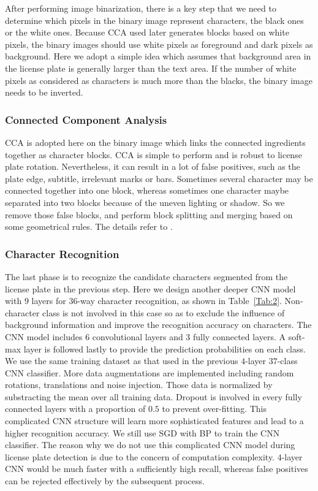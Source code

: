 \documentclass[twocolumn]{svjour3}
\begin{document}
After performing image binarization, there is a key step that we need to determine which pixels in the binary image represent characters, the black ones or the white ones. Because CCA used later generates blocks based on white pixels, the binary images should use white pixels as foreground and dark pixels as background. Here we adopt a simple idea which assumes that background area in the license plate is generally larger than the text area. If the number of white pixels as considered as characters is much more than the blacks, the binary image needs to be inverted.

\subsubsection{Connected Component Analysis}
CCA is adopted here on the binary image which links the connected ingredients together as character blocks. %
CCA is simple to perform and is robust to license plate rotation. Nevertheless, it can result in a lot of false positives, such as the plate edge, subtitle, irrelevant marks or bars. Sometimes several character may be connected together into one block, whereas sometimes one character maybe separated into two blocks because of the uneven lighting or shadow. So we remove those false blocks, and perform block splitting and merging based on some geometrical rules. The details refer to \cite{Yoon2011}.

\subsubsection{Character Recognition}
The last phase is to recognize the candidate characters segmented from the license plate in the previous step.
Here we design another deeper CNN model with $9$ layers for $36$-way character recognition, as shown in Table~\ref{Tab:2}. Non-character class is not involved in this case so as to exclude the influence of background information and improve the recognition accuracy on characters. The CNN model includes $6$ convolutional layers and $3$ fully connected layers. A soft-max layer is followed lastly to provide the prediction probabilities on each class.
We use the same training dataset as that used in the previous $4$-layer $37$-class CNN classifier. More data augmentations are implemented including random rotations, translations and noise injection. Those data is normalized by substracting the mean over all training data. Dropout is involved in every fully connected layers with a proportion of $0.5$ to prevent over-fitting. This complicated CNN structure will learn more sophisticated features and lead to a higher recognition accuracy. We still use SGD with BP to train the CNN classifier. The reason why we do not use this complicated CNN model during license plate detection is due to the concern of computation complexity. $4$-layer CNN would be much faster with a sufficiently high recall, whereas false positives can be rejected effectively by the subsequent process.
\end{document}
